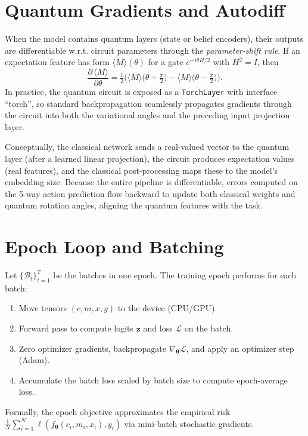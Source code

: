 \documentclass[11pt]{article}
\begin{document}
\section{Quantum Gradients and Autodiff}

When the model contains quantum layers (state or belief encoders), their outputs are differentiable w.r.t. circuit parameters through the \emph{parameter-shift rule}. If an expectation feature has form $\langle M \rangle(\theta)$ for a gate $e^{-i\theta H/2}$ with $H^2=I$, then
\begin{equation}
  \frac{\partial \, \langle M \rangle}{\partial \theta}
  = \tfrac{1}{2} \Big( \langle M \rangle\big(\theta + \tfrac{\pi}{2}\big) - \langle M \rangle\big(\theta - \tfrac{\pi}{2}\big) \Big).
\end{equation}
In practice, the quantum circuit is exposed as a \texttt{TorchLayer} with interface ``torch'', so standard backpropagation seamlessly propagates gradients through the circuit into both the variational angles and the preceding input projection layer.

Conceptually, the classical network sends a real-valued vector to the quantum layer (after a learned linear projection), the circuit produces expectation values (real features), and the classical post-processing maps these to the model’s embedding size. Because the entire pipeline is differentiable, errors computed on the 5-way action prediction flow backward to update both classical weights and quantum rotation angles, aligning the quantum features with the task.

\section{Epoch Loop and Batching}

Let $\{\mathcal{B}_t\}_{t=1}^{T}$ be the batches in one epoch. The training epoch performs for each batch:
\begin{enumerate}
  \item Move tensors $(c,m,x,y)$ to the device (CPU/GPU).
  \item Forward pass to compute logits $\bm{z}$ and loss $\mathcal{L}$ on the batch.
  \item Zero optimizer gradients, backpropagate $\nabla_{\bm{\theta}} \mathcal{L}$, and apply an optimizer step (Adam).
  \item Accumulate the batch loss scaled by batch size to compute epoch-average loss.
\end{enumerate}
Formally, the epoch objective approximates the empirical risk $\tfrac{1}{N}\sum_{i=1}^N \ell(f_{\bm{\theta}}(c_i,m_i,x_i), y_i)$ via mini-batch stochastic gradients.
\end{document}

